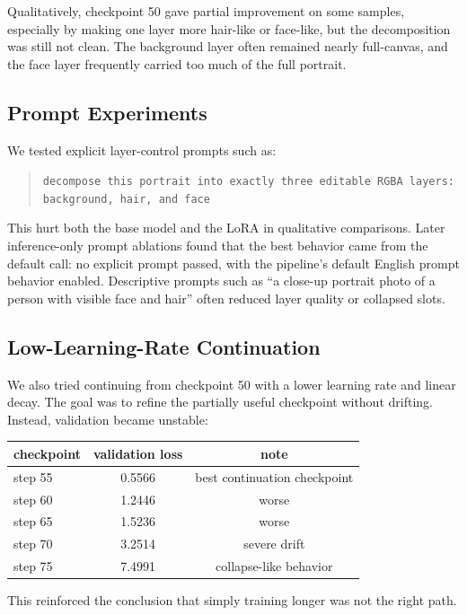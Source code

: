 \documentclass[11pt]{article}
\begin{document}
Qualitatively, checkpoint 50 gave partial improvement on some samples, especially
by making one layer more hair-like or face-like, but the decomposition was still
not clean. The background layer often remained nearly full-canvas, and the face
layer frequently carried too much of the full portrait.

\subsection{Prompt Experiments}

We tested explicit layer-control prompts such as:

\begin{quote}
\texttt{decompose this portrait into exactly three editable RGBA layers: background, hair, and face}
\end{quote}

This hurt both the base model and the LoRA in qualitative comparisons. Later
inference-only prompt ablations found that the best behavior came from the
default call: no explicit prompt passed, with the pipeline's default English prompt
behavior enabled. Descriptive prompts such as ``a close-up portrait photo of a
person with visible face and hair'' often reduced layer quality or collapsed slots.

\subsection{Low-Learning-Rate Continuation}

We also tried continuing from checkpoint 50 with a lower learning rate and linear
decay. The goal was to refine the partially useful checkpoint without drifting.
Instead, validation became unstable:

\begin{center}
\begin{tabular}{lcc}
\toprule
checkpoint & validation loss & note \\
\midrule
step 55 & 0.5566 & best continuation checkpoint \\
step 60 & 1.2446 & worse \\
step 65 & 1.5236 & worse \\
step 70 & 3.2514 & severe drift \\
step 75 & 7.4991 & collapse-like behavior \\
\bottomrule
\end{tabular}
\end{center}

This reinforced the conclusion that simply training longer was not the right path.
\end{document}
